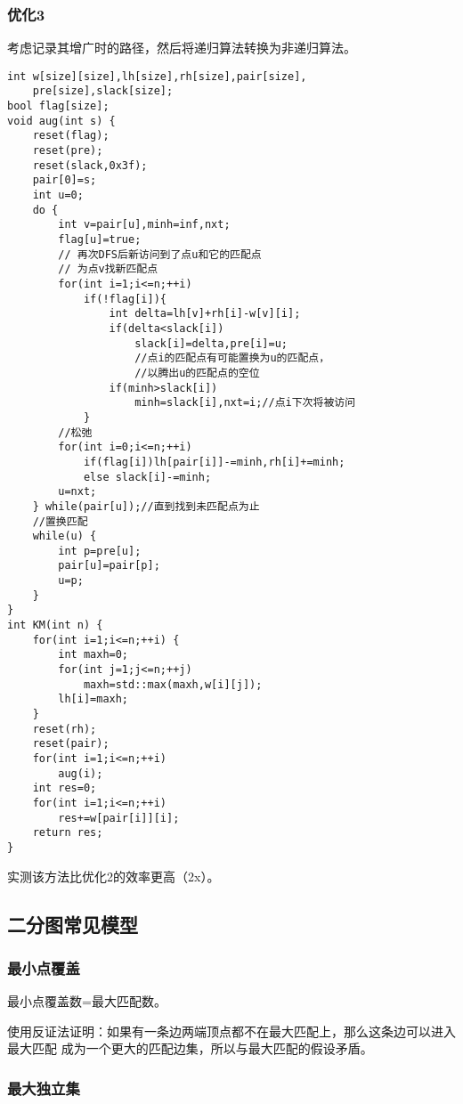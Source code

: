 \subsubsection{优化3}
考虑记录其增广时的路径，然后将递归算法转换为非递归算法。
\begin{lstlisting}
int w[size][size],lh[size],rh[size],pair[size],
    pre[size],slack[size];
bool flag[size];
void aug(int s) {
    reset(flag);
    reset(pre);
    reset(slack,0x3f);
    pair[0]=s;
    int u=0;
    do {
        int v=pair[u],minh=inf,nxt;
        flag[u]=true;
        // 再次DFS后新访问到了点u和它的匹配点
        // 为点v找新匹配点
        for(int i=1;i<=n;++i)
            if(!flag[i]){
                int delta=lh[v]+rh[i]-w[v][i];
                if(delta<slack[i])
                    slack[i]=delta,pre[i]=u;
                    //点i的匹配点有可能置换为u的匹配点，
                    //以腾出u的匹配点的空位
                if(minh>slack[i])
                    minh=slack[i],nxt=i;//点i下次将被访问
            }
        //松弛
        for(int i=0;i<=n;++i)
            if(flag[i])lh[pair[i]]-=minh,rh[i]+=minh;
            else slack[i]-=minh;
        u=nxt;
    } while(pair[u]);//直到找到未匹配点为止
    //置换匹配
    while(u) {
        int p=pre[u];
        pair[u]=pair[p];
        u=p;
    }
}
int KM(int n) {
    for(int i=1;i<=n;++i) {
        int maxh=0;
        for(int j=1;j<=n;++j)
            maxh=std::max(maxh,w[i][j]);
        lh[i]=maxh;
    }
    reset(rh);
    reset(pair);
    for(int i=1;i<=n;++i)
        aug(i);
    int res=0;
    for(int i=1;i<=n;++i)
        res+=w[pair[i]][i];
    return res;
}
\end{lstlisting}
实测该方法比优化2的效率更高（2x）。
\subsection{二分图常见模型}
\subsubsection{最小点覆盖}
\begin{theorem}
	最小点覆盖数=最大匹配数。
\end{theorem}

使用反证法证明：如果有一条边两端顶点都不在最大匹配上，那么这条边可以进入最大匹配
成为一个更大的匹配边集，所以与最大匹配的假设矛盾。

\subsubsection{最大独立集}

